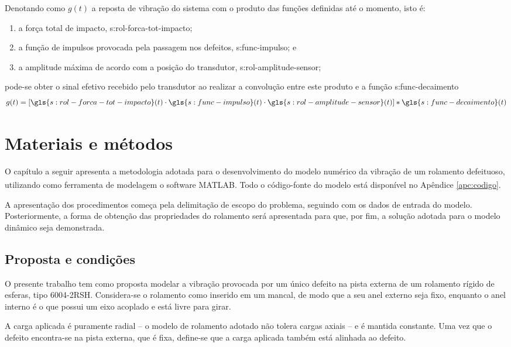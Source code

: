 \documentclass[12pt,oneside,english,brazil,lmodern,siglas,simbolos,cite=num]{ucsmonograph}
\begin{document}
	Denotando como $ g(t) $ a reposta de vibração do sistema com o produto das funções definidas até o momento, isto é:
	\begin{enumerate}
		\item a força total de impacto, \gls{s:rol-forca-tot-impacto};
		\item a função de impulsos provocada pela passagem nos defeitos, \gls{s:func-impulso}; e
		\item a amplitude máxima de acordo com a posição do transdutor, \gls{s:rol-amplitude-sensor};
	\end{enumerate}
	pode-se obter o sinal efetivo recebido pelo transdutor ao realizar a convolução entre este produto e a função \gls{s:func-decaimento} \cite{mcfadden:1984,cong:2013}
	\begin{equation}
		g(t) = [\gls{s:rol-forca-tot-impacto}(t)\cdot \gls{s:func-impulso}(t)\cdot \gls{s:rol-amplitude-sensor}(t)]\ast\gls{s:func-decaimento}(t)
	\end{equation}
	
	\chapter{Materiais e métodos}
	O capítulo a seguir apresenta a metodologia adotada para o desenvolvimento do modelo numérico da vibração de um rolamento defeituoso, utilizando como ferramenta de modelagem o \foreignlanguage{english}{software} MATLAB\textsuperscript\textregistered.
	Todo o código-fonte do modelo está disponível no Apêndice \ref{apc:codigo}.
	
	A apresentação dos procedimentos começa pela delimitação de escopo do problema, seguindo com os dados de entrada do modelo.
	Posteriormente, a forma de obtenção das propriedades do rolamento será apresentada para que, por fim, a solução adotada para o modelo dinâmico seja demonstrada.
	
	\section{Proposta e condições} \label{sec:proposta-condicoes}
	O presente trabalho tem como proposta modelar a vibração provocada por um único defeito na pista externa de um rolamento rígido de esferas, tipo 6004-2RSH.
	Considera-se o rolamento como inserido em um mancal, de modo que a seu anel externo seja fixo, enquanto o anel interno é o que possui um eixo acoplado e está livre para girar.
	
	A carga aplicada é puramente radial -- o modelo de rolamento adotado não tolera cargas axiais -- e é mantida constante.
	Uma vez que o defeito encontra-se na pista externa, que é fixa, define-se que a carga aplicada também está alinhada ao defeito.
	
\end{document}
